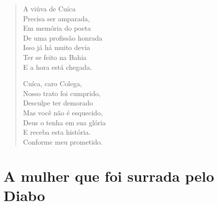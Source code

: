 \begin{verse}
A viúva de Cuíca \\
Precisa ser amparada, \\
Em memória do poeta \\
De uma profissão honrada \\
Isso já há muito devia \\
Ter se feito na Bahia \\
E a hora está chegada. 


Cuíca, caro Colega, \\
Nosso trato foi cumprido, \\
Desculpe ter demorado \\
Mas você não é esquecido, \\
Deus o tenha em sua glória \\
E receba esta história. \\
Conforme meu prometido. 
\end{verse}

\chapter{A mulher que foi surrada pelo Diabo}

